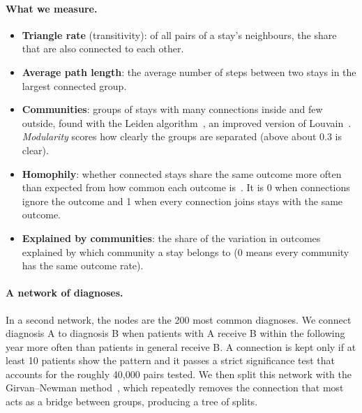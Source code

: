 \paragraph{What we measure.}
\begin{itemize}
  \item \textbf{Triangle rate} (transitivity): of all pairs of a stay's neighbours, the share that are also connected to each other.
  \item \textbf{Average path length}: the average number of steps between two stays in the largest connected group.
  \item \textbf{Communities}: groups of stays with many connections inside and few outside, found with the Leiden algorithm~\cite{traag2019louvain}, an improved version of Louvain~\cite{blondel2008fast}. \emph{Modularity} scores how clearly the groups are separated (above about 0.3 is clear).
  \item \textbf{Homophily}: whether connected stays share the same outcome more often than expected from how common each outcome is~\cite{lim2021large}. It is 0 when connections ignore the outcome and 1 when every connection joins stays with the same outcome.
  \item \textbf{Explained by communities}: the share of the variation in outcomes explained by which community a stay belongs to (0 means every community has the same outcome rate).
\end{itemize}

\paragraph{A network of diagnoses.} In a second network, the nodes are the 200 most common diagnoses. We connect diagnosis A to diagnosis B when patients with A receive B within the following year more often than patients in general receive B. A connection is kept only if at least 10 patients show the pattern and it passes a strict significance test that accounts for the roughly 40,000 pairs tested. We then split this network with the Girvan--Newman method~\cite{girvan2002community}, which repeatedly removes the connection that most acts as a bridge between groups, producing a tree of splits.
